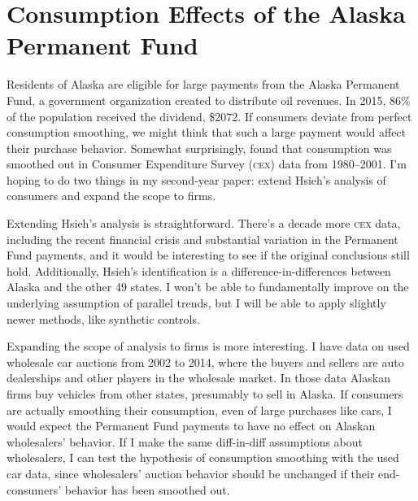 \documentclass[11pt,letterpaper,oneside]{article}
\newcommand{\cex}{\textsc{cex}}
\begin{document}
\section{Consumption Effects of the Alaska Permanent Fund}
\noindent Residents of Alaska are eligible for large payments from the Alaska Permanent Fund, a government organization created to distribute oil revenues.
In 2015, 86\% of the population received the dividend, \$2072.
If consumers deviate from perfect consumption smoothing, we might think that such a large payment would affect their purchase behavior.
Somewhat surprisingly, \textcite{hsieh2003} found that consumption was smoothed out in Consumer Expenditure Survey (\cex) data from 1980--2001.
I'm hoping to do two things in my second-year paper: extend Hsieh's analysis of consumers and expand the scope to firms.

Extending Hsieh's analysis is straightforward.
There's a decade more \cex{} data, including the recent financial crisis and substantial variation in the Permanent Fund payments, and it would be interesting to see if the original conclusions still hold.
Additionally, Hsieh's identification is a difference-in-differences between Alaska and the other 49 states.
I won't be able to fundamentally improve  %
on the underlying assumption of parallel trends, but I will be able to apply slightly newer methods, like synthetic controls. 

Expanding the scope of analysis to firms is more interesting.
I have data on used wholesale car auctions from 2002 to 2014, where the buyers and sellers are auto dealerships and other players in the wholesale market.
In those data Alaskan firms buy vehicles from other states, presumably to sell in Alaska.
If consumers are actually smoothing their consumption, even of large purchases like cars, I would expect the Permanent Fund payments to have no effect on Alaskan wholesalers' behavior.  
If I make the same diff-in-diff assumptions about wholesalers, I can test the hypothesis of consumption smoothing with the used car data, since wholesalers' auction behavior should be unchanged if their end-consumers' behavior has been smoothed out.
\end{document}
